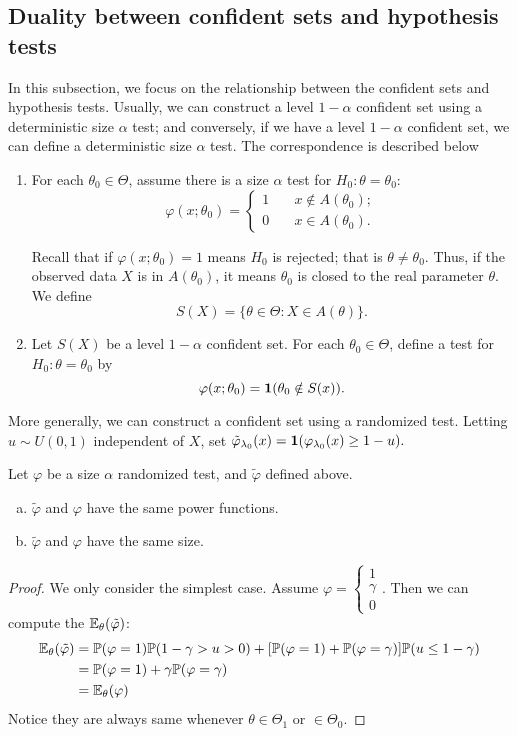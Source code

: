 \subsection{Duality between confident sets and hypothesis tests}
In this subsection, we focus on the relationship between the confident sets and hypothesis tests. Usually, we can construct a level $1-\alpha$ confident set using a deterministic size $\alpha$ test; and conversely, if we have a level $1-\alpha$ confident set, we can define a deterministic size $\alpha$ test. The correspondence is described below
\begin{enumerate}
	\item For each $\theta_0 \in \Theta$, assume there is a size $\alpha$ test for $H_0: \theta=\theta_0$:
	$$\varphi(x;\theta_0) = \begin{cases}
	1 &\quad x\notin A(\theta_0); \\ 
	0 &\quad x\in A(\theta_0).
	\end{cases}$$
	
	Recall that if $\varphi(x;\theta_0) = 1$ means $H_0$ is rejected; that is $\theta \neq \theta_0$. Thus, if the observed data $X$ is in $A(\theta_0)$, it means $\theta_0$ is closed to the real parameter $\theta$. We define 
	$$S(X) = \{ \theta\in \Theta: X\in A(\theta) \}.$$
	 
	\item Let $S(X)$ be a level $1-\alpha$ confident set. For each $\theta_0 \in \Theta$, define a test for $H_0: \theta=\theta_0$ by
	$$\varphi(x;\theta_0) = \boldsymbol{1}(\theta_0 \notin S(x)).$$
\end{enumerate}  
More generally, we can construct a confident set using a randomized test. Letting $u\sim U(0,1)$ independent of $X$, set $\tilde{\varphi}_{\lambda_0}(x) = \boldsymbol{1}( \varphi_{\lambda_0}(x) \geq 1-u ).$ 
\begin{prop}Let $\varphi$ be a size $\alpha$ randomized test, and $\tilde{\varphi}$ defined above.
	\begin{enumerate}[a)]
		\item $\tilde{\varphi}$ and $\varphi$ have the same power functions.
		\item $\tilde{\varphi}$ and $\varphi$ have the same size.
	\end{enumerate} 
\end{prop}
\begin{proof}
	We only consider the simplest case. Assume $\varphi = \begin{cases}
	1 \\
	\gamma \\
	0
	\end{cases}$. Then we can compute the $\mathbb{E}_\theta (\tilde{\varphi})$:
	\begin{align*}
		\mathbb{E}_\theta (\tilde{\varphi}) &= \mathbb{P}( \varphi = 1 ) \mathbb{P}( 1-\gamma > u > 0 ) + [\mathbb{P}( \varphi = 1) + \mathbb{P}(\varphi = \gamma)] \mathbb{P}( u \leq 1-\gamma ) \\
		&= \mathbb{P}(\varphi = 1) + \gamma \mathbb{P}(\varphi = \gamma) \\
		&= \mathbb{E}_\theta (\varphi)
	\end{align*}
	Notice they are always same whenever $\theta \in \Theta_1$ or $\in \Theta_0$.
\end{proof}

